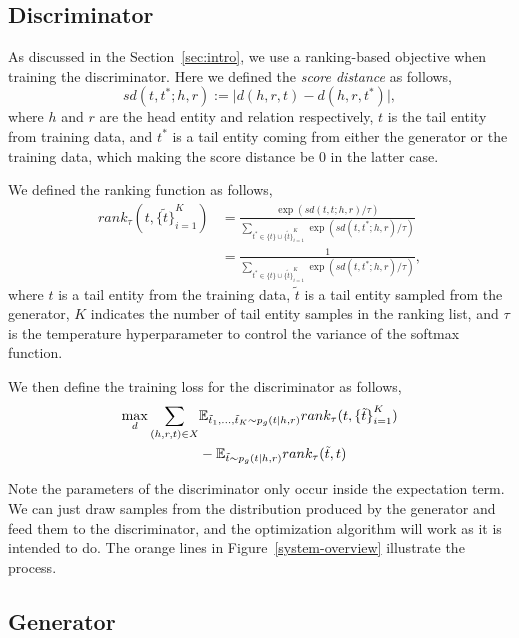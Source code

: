 \documentclass[twocolumn,a4paper,10pt,preprint,3p]{elsarticle}
\begin{document}
\subsection{Discriminator}

As discussed in the Section~\ref{sec:intro}, we use a ranking-based objective when training the discriminator. Here we defined the \emph{score distance} as follows,
\[
    sd(t, t^*; h, r) := \lvert d(h, r, t) - d(h, r, t^*) \rvert,
\]
where $h$ and $r$ are the head entity and relation respectively, $t$ is the tail entity from training data, and $t^*$ is a tail entity coming from either the generator or the training data, which making the score distance be 0 in the latter case.

We defined the ranking function as follows,
\begin{align*}
    rank_\tau(t, {\{\tilde t \}}_{i=1}^K)
    &= \frac{\exp(sd(t, t; h, r) / \tau)}
        {\sum_{t^*\in \{t\} \cup {\{\tilde t \}}_{i=1}^K } \exp (sd(t, t^*; h, r) / \tau) } \\
    &= \frac{1}
        {\sum_{t^*\in \{t\} \cup {\{\tilde t \}}_{i=1}^K } \exp (sd(t, t^*; h, r) / \tau) },
\end{align*}
where $t$ is a tail entity from the training data, $\tilde t$ is a tail entity sampled from the generator, $K$ indicates the number of tail entity samples in the ranking list, and $\tau$ is the temperature hyperparameter to control the variance of the softmax function.

We then define the training loss for the discriminator as follows,
\begin{align}
    \max_d \sum_{(h, r, t)\in X}
        &\mathbb{E}_{\tilde t_1, \dots, \tilde t_K \sim p_g(t \mid h, r)}
            rank_\tau(t, {\{\tilde t \}}_{i=1}^K) \notag \\
        &- \mathbb{E}_{\tilde t \sim p_g(t \mid h, r)}
            rank_\tau(\tilde t, t) \label{eq:d_loss}
\end{align}


Note the parameters of the discriminator only occur inside the expectation term. We can just draw samples from the distribution produced by the generator and feed them to the discriminator, and the optimization algorithm will work as it is intended to do. The orange lines in Figure~\ref{system-overview} illustrate the process.

\subsection{Generator}
\end{document}
